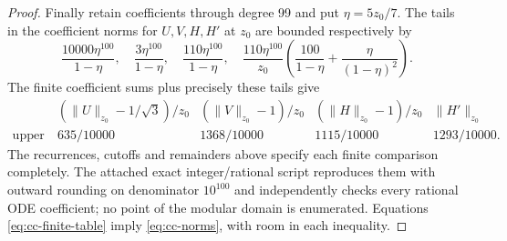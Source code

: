 \begin{proof}
Finally retain coefficients through degree 99 and put
$\eta=5z_0/7$. The tails in the coefficient norms for
$U,V,H,H'$ at $z_0$ are bounded respectively by
\begin{equation}\label{eq:cc-tail100}
 \frac{10000\eta^{100}}{1-\eta},\quad
 \frac{3\eta^{100}}{1-\eta},\quad
 \frac{110\eta^{100}}{1-\eta},\quad
 \frac{110\eta^{100}}{z_0}
 \left(\frac{100}{1-\eta}+\frac{\eta}{(1-\eta)^2}\right).
\end{equation}
The finite coefficient sums plus precisely these tails give
\begin{equation}\label{eq:cc-finite-table}
 \begin{array}{c|cccc}
 & (\|U\|_{z_0}-1/\sqrt3)/z_0
 & (\|V\|_{z_0}-1)/z_0
 & (\|H\|_{z_0}-1)/z_0 & \|H'\|_{z_0}\\ \hline
 \text{upper bound}&635/10000&1368/10000&1115/10000&1293/10000.
 \end{array}
\end{equation}
The recurrences, cutoffs and remainders above specify each finite
comparison completely. The attached exact integer/rational
script reproduces them with outward rounding on denominator
$10^{100}$ and independently checks every rational ODE
coefficient; no point of the modular domain is enumerated.
Equations \eqref{eq:cc-finite-table} imply
\eqref{eq:cc-norms}, with room in each inequality.


\end{proof}
